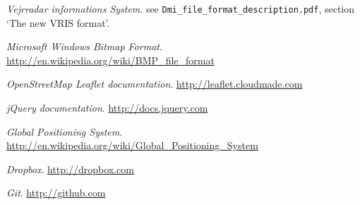 \renewcommand\bibname{References}

\begin{thebibliography}{10}
\emph{Vejrradar informations System}.
see \texttt{Dmi\_file\_format\_description.pdf}, section `The new VRIS format'.

\emph{Microsoft Windows Bitmap Format}.
\url{http://en.wikipedia.org/wiki/BMP_file_format}

\emph{OpenStreetMap Leaflet documentation}.
\url{http://leaflet.cloudmade.com}

\emph{jQuery documentation}.
\url{http://docs.jquery.com}

\emph{Global Positioning System}.
\url{http://en.wikipedia.org/wiki/Global_Positioning_System}

\emph{Dropbox}.
\url{http://dropbox.com}

\emph{Git}.
\url{http://github.com}
\end{thebibliography}
